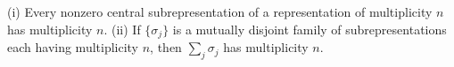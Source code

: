 (i) Every nonzero central subrepresentation of a representation of multiplicity $n$ has multiplicity $n$. (ii) If $\{\sigma_j\}$ is a mutually disjoint family of subrepresentations each having multiplicity $n$, then $\sum_j \sigma_j$ has multiplicity $n$.
